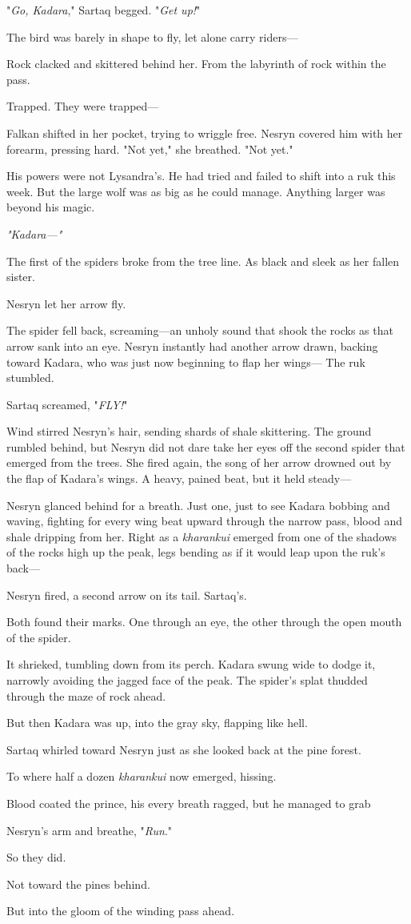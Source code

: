 "\emph{Go, Kadara}," Sartaq begged. "\emph{Get up!}"

The bird was barely in shape to fly, let alone carry riders---

Rock clacked and skittered behind her. From the labyrinth of rock within the pass.

Trapped. They were trapped---

Falkan shifted in her pocket, trying to wriggle free. Nesryn covered him with her forearm, pressing hard. "Not yet," she breathed. "Not yet."

His powers were not Lysandra's. He had tried and failed to shift into a ruk this week. But the large wolf was as big as he could manage. Anything larger was beyond his magic.

\emph{"Kadara---"}

The first of the spiders broke from the tree line. As black and sleek as her fallen sister.

Nesryn let her arrow fly.

The spider fell back, screaming---an unholy sound that shook the rocks as that arrow sank into an eye. Nesryn instantly had another arrow drawn, backing toward Kadara, who was just now beginning to flap her wings--- The ruk stumbled.

Sartaq screamed, "\emph{FLY!}"

Wind stirred Nesryn's hair, sending shards of shale skittering. The ground rumbled behind, but Nesryn did not dare take her eyes off the second spider that emerged from the trees. She fired again, the song of her arrow drowned out by the flap of Kadara's wings. A heavy, pained beat, but it held steady---

Nesryn glanced behind for a breath. Just one, just to see Kadara bobbing and waving, fighting for every wing beat upward through the narrow pass, blood and shale dripping from her. Right as a \emph{kharankui} emerged from one of the shadows of the rocks high up the peak, legs bending as if it would leap upon the ruk's back---

Nesryn fired, a second arrow on its tail. Sartaq's.

Both found their marks. One through an eye, the other through the open mouth of the spider.

It shrieked, tumbling down from its perch. Kadara swung wide to dodge it, narrowly avoiding the jagged face of the peak. The spider's splat thudded through the maze of rock ahead.

But then Kadara was up, into the gray sky, flapping like hell.

Sartaq whirled toward Nesryn just as she looked back at the pine forest.

To where half a dozen \emph{kharankui} now emerged, hissing.

Blood coated the prince, his every breath ragged, but he managed to grab

Nesryn's arm and breathe, "\emph{Run}."

So they did.

Not toward the pines behind.

But into the gloom of the winding pass ahead.

